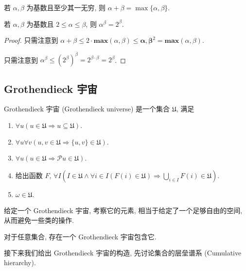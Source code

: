\begin{corollary}
    若 \(\alpha, \beta\) 为基数且至少其一无穷, 则 \(\alpha + \beta = \max \{\alpha, \beta\}\).

    若 \(\alpha, \beta\) 为基数且 \(2 \le \alpha \le \beta\), 则 \(\alpha^\beta = 2^\beta\).

    \begin{proof}
        只需注意到 \(\alpha + \beta \le 2 \cdot \mathbf{max} (\alpha, \beta) \le \mathbf{\alpha, \beta}^2 = \mathbf{max} (\alpha, \beta)\).

        只需注意到 \(\alpha^\beta \le {(2^\beta)}^\beta = 2^{\beta \cdot \beta} = 2^\beta\).
    \end{proof}
\end{corollary}

\subsection{Grothendieck 宇宙}

\begin{definition}
    Grothendieck 宇宙 (Grothendieck universe) 是一个集合 \(\mathfrak{U}\), 满足
    \begin{enumerate}
        \item \(\forall u (u \in \mathfrak{U} \Rightarrow u \subseteq \mathfrak{U})\).
        \item \(\forall u \forall v (u, v \in \mathfrak{U} \Rightarrow \{u,v\} \in \mathfrak{U})\).
        \item \(\forall u (u \in \mathfrak{U} \Rightarrow \mathcal{P} u \in \mathfrak{U})\).
        \item 给出函数 \(F\), \(\forall I (I \in \mathfrak{U} \land \forall i \in I (F(i) \in \mathfrak{U}) \Rightarrow \bigcup_{i \in I} F(i) \in \mathfrak{U})\).
        \item \(\omega \in \mathfrak{U}\).
    \end{enumerate}
\end{definition}

给定一个 Grothendieck 宇宙, 考察它的元素, 相当于给定了一个足够自由的空间, 从而避免一些类的操作.

\begin{hypothesis}
    [Grothendieck] \label{hypothesis:Grothendieck universe}
    对于任意集合, 存在一个 Grothendieck 宇宙包含它.
\end{hypothesis}

接下来我们给出 Grothendieck 宇宙的构造, 先讨论集合的层垒谱系 (Cumulative hierarchy).

